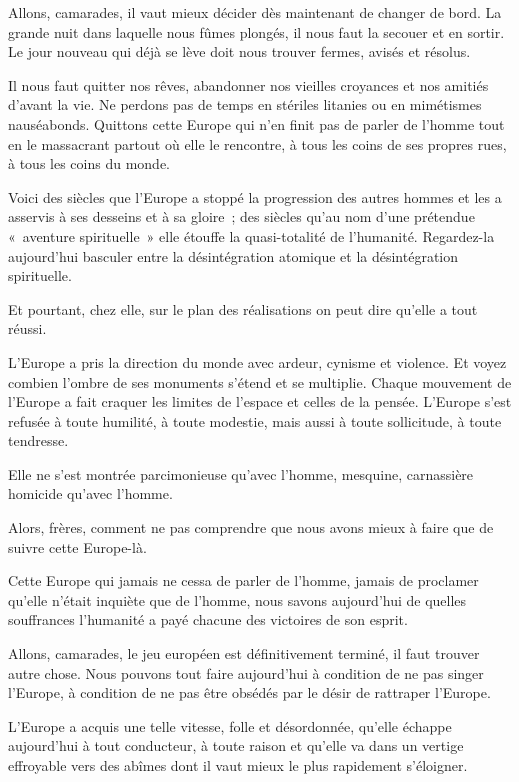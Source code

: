 \documentclass[french,twoside]{book} %
\newcommand\chaptercont{} %
\begin{document}
\chaptercont
\noindent Allons, camarades, il vaut mieux décider dès maintenant de changer de bord. La grande nuit dans laquelle nous fûmes plongés, il nous faut la secouer et en sortir. Le jour nouveau qui déjà se lève doit nous trouver fermes, avisés et résolus.\par
Il nous faut quitter nos rêves, abandonner nos vieilles croyances et nos amitiés d’avant la vie. Ne perdons pas de temps en stériles litanies ou en mimétismes nauséabonds. Quittons cette Europe qui n’en finit pas de parler de l’homme tout en le massacrant partout où elle le rencontre, à tous les coins de ses propres rues, à tous les coins du monde.\par
Voici des siècles que l’Europe a stoppé la progression des autres hommes et les a asservis à ses desseins et à sa gloire ; des siècles qu’au nom d’une prétendue « aventure spirituelle » elle étouffe la quasi-totalité de l’humanité. Regardez-la aujourd’hui basculer entre la désintégration atomique et la désintégration spirituelle.\par
Et pourtant, chez elle, sur le plan des réalisations on peut dire qu’elle a tout réussi.\par
L’Europe a pris la direction du monde avec ardeur, cynisme et violence. Et voyez combien l’ombre de ses monuments s’étend et se multiplie. Chaque mouvement de l’Europe a fait craquer les limites de l’espace et celles de la pensée. L’Europe s’est refusée à toute humilité, à toute modestie, mais aussi à toute sollicitude, à toute tendresse.\par
Elle ne s’est montrée parcimonieuse qu’avec l’homme, mesquine, carnassière homicide qu’avec l’homme.\par
Alors, frères, comment ne pas comprendre que nous avons mieux à faire que de suivre cette Europe-là.\par
 Cette Europe qui jamais ne cessa de parler de l’homme, jamais de proclamer qu’elle n’était inquiète que de l’homme, nous savons aujourd’hui de quelles souffrances l’humanité a payé chacune des victoires de son esprit.\par
Allons, camarades, le jeu européen est définitivement terminé, il faut trouver autre chose. Nous pouvons tout faire aujourd’hui à condition de ne pas singer l’Europe, à condition de ne pas être obsédés par le désir de rattraper l’Europe.\par
L’Europe a acquis une telle vitesse, folle et désordonnée, qu’elle échappe aujourd’hui à tout conducteur, à toute raison et qu’elle va dans un vertige effroyable vers des abîmes dont il vaut mieux le plus rapidement s’éloigner.\par
\end{document}
